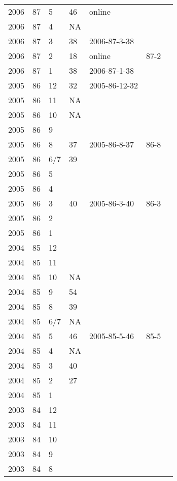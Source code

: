 \begin{longtable}{ |l|l|l|l|p{2.7cm}|l|p{2cm}| }
 2006 & 87 &     5 &      46 & online &  & \\
 2006 & 87 &     4 &      NA &  &  & \\
 2006 & 87 &     3 &      38 & 2006-87-3-38 &  & \\
 2006 & 87 &     2 &      18 & online & 87-2  & \\
 2006 & 87 &     1 &      38 & 2006-87-1-38 &  & \\
 2005 & 86 &    12 &      32 & 2005-86-12-32 &  & \\
 2005 & 86 &    11 &      NA &  &  & \\
 2005 & 86 &    10 &      NA &  &  & \\
 2005 & 86 &     9 &         &  &  & \\
 2005 & 86 &     8 &      37 & 2005-86-8-37 & 86-8  & \\
 2005 & 86 &   6/7 &      39 &  &  & \\
 2005 & 86 &     5 &         &  &  & \\
 2005 & 86 &     4 &         & &  & \\
 2005 & 86 &     3 &      40 &  2005-86-3-40 & 86-3 & \\
 2005 & 86 &     2 &         &  &  & \\
 2005 & 86 &     1 &         &  &  & \\
 2004 & 85 &    12 &         &  &  & \\
 2004 & 85 &    11 &         &  &  & \\
 2004 & 85 &    10 &      NA &  &  & \\
 2004 & 85 &     9 &      54 &  &  & \\
 2004 & 85 &     8 &      39 &  &  & \\
 2004 & 85 &   6/7 &      NA &  &  & \\
 2004 & 85 &     5 &      46 & 2005-85-5-46 & 85-5 & \\
 2004 & 85 &     4 &      NA &  &  & \\
 2004 & 85 &     3 &      40 &  &  & \\
 2004 & 85 &     2 &      27 &  &  & \\
 2004 & 85 &     1 &         &  &  & \\
 2003 & 84 &    12 &         &  &  & \\
 2003 & 84 &    11 &         &  &  & \\
 2003 & 84 &    10 &         &  &  & \\
 2003 & 84 &     9 &         &  &  & \\
 2003 & 84 &     8 &         &  &  & \\

\end{longtable}
